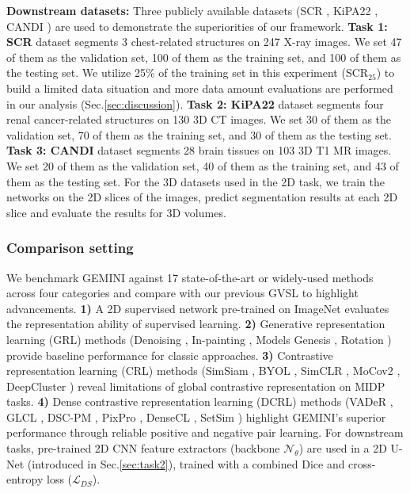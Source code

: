 \textbf{Downstream datasets:} Three publicly available datasets (SCR \cite{van2006segmentation}, KiPA22 \cite{he2021meta}, CANDI \cite{kennedy2012candishare}) are used to demonstrate the superiorities of our framework. \textbf{Task 1: SCR} dataset \cite{van2006segmentation} segments 3 chest-related structures on 247 X-ray images. We set 47 of them as the validation set, 100 of them as the training set, and 100 of them as the testing set. We utilize 25\% of the training set in this experiment (SCR$_{25}$) to build a limited data situation and more data amount evaluations are performed in our analysis (Sec.\ref{sec:discussion}). \textbf{Task 2: KiPA22} dataset \cite{he2021meta} segments four renal cancer-related structures on 130 3D CT images. We set 30 of them as the validation set, 70 of them as the training set, and 30 of them as the testing set. \textbf{Task 3: CANDI} dataset \cite{kennedy2012candishare} segments 28 brain tissues on 103 3D T1 MR images. We set 20 of them as the validation set, 40 of them as the training set, and 43 of them as the testing set. For the 3D datasets used in the 2D task, we train the networks on the 2D slices of the images, predict segmentation results at each 2D slice and evaluate the results for 3D volumes.

\subsubsection{Comparison setting} We benchmark GEMINI against 17 state-of-the-art or widely-used methods across four categories and compare with our previous GVSL to highlight advancements. \textbf{1)} A 2D supervised network pre-trained on ImageNet \cite{deng2009imagenet} evaluates the representation ability of supervised learning. \textbf{2)} Generative representation learning (GRL) methods (Denoising \cite{vincent2010stacked}, In-painting \cite{pathak2016context}, Models Genesis \cite{zhou2019models}, Rotation \cite{komodakis2018unsupervised}) provide baseline performance for classic approaches. \textbf{3)} Contrastive representation learning (CRL) methods (SimSiam \cite{Chen2021CVPR}, BYOL \cite{grill2020bootstrap}, SimCLR \cite{chen2020simple}, MoCov2 \cite{chen2020improved}, DeepCluster \cite{caron2018deep}) reveal limitations of global contrastive representation on MIDP tasks. \textbf{4)} Dense contrastive representation learning (DCRL) methods (VADeR \cite{o2020unsupervised}, GLCL \cite{chaitanya2020contrastive}, DSC-PM \cite{li2021dense}, PixPro \cite{xie2021propagate}, DenseCL \cite{wang2022densecl}, SetSim \cite{wang2022exploring}) highlight GEMINI's superior performance through reliable positive and negative pair learning. For downstream tasks, pre-trained 2D CNN feature extractors (backbone $\mathcal{N}_{\theta}$) are used in a 2D U-Net \cite{ronneberger2015u} (introduced in Sec.\ref{sec:task2}), trained with a combined Dice and cross-entropy loss ($\mathcal{L}_{DS}$).

